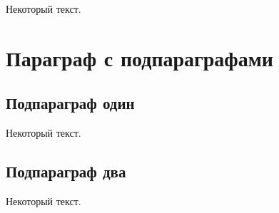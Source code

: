 Некоторый текст.

\section{Параграф с подпараграфами}\label{sec:ch3/sect3}

\subsection{Подпараграф \texorpdfstring{\cyrdash}{---} один}\label{subsec:ch3/sect3/sub1}

Некоторый текст.

\subsection{Подпараграф \texorpdfstring{\cyrdash}{---} два}\label{subsec:ch3/sect3/sub2}

Некоторый текст.

\clearpage
